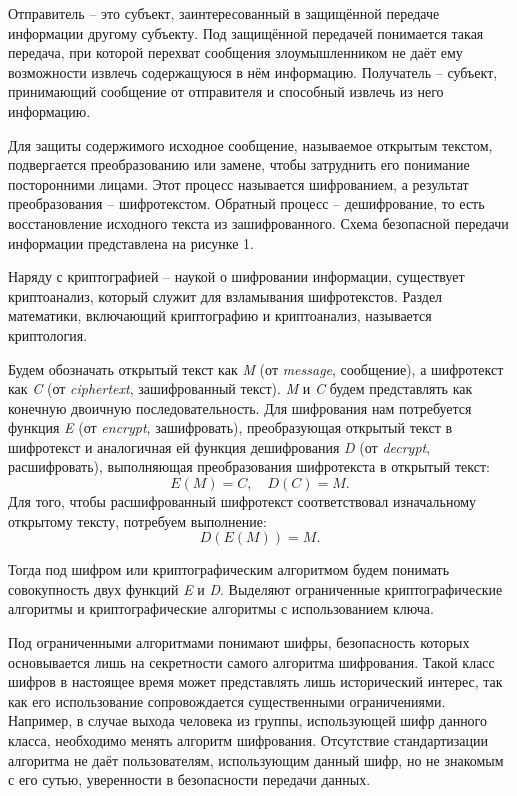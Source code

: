Отправитель – это субъект, заинтересованный в защищённой передаче информации другому субъекту. Под защищённой передачей понимается такая передача, при которой перехват сообщения злоумышленником не даёт ему возможности извлечь содержащуюся в нём информацию. Получатель – субъект, принимающий сообщение от отправителя и способный извлечь из него информацию.

Для защиты содержимого исходное сообщение, называемое открытым текстом, подвергается преобразованию или замене, чтобы затруднить его понимание посторонними лицами. Этот процесс называется шифрованием, а результат преобразования – шифротекстом. Обратный процесс – дешифрование, то есть восстановление исходного текста из зашифрованного.
Схема безопасной передачи информации представлена на рисунке 1.

\mbox{}


Наряду с криптографией – наукой о шифровании информации, существует криптоанализ, который служит для взламывания шифротекстов. Раздел математики, включающий криптографию и криптоанализ, называется криптология.

Будем обозначать открытый текст как \textit{M} (от \textit{message}, сообщение), а шифротекст как \textit{C} (от \textit{ciphertext}, зашифрованный текст). \textit{M} и \textit{C} будем представлять как конечную двоичную последовательность. Для шифрования нам потребуется функция \textit{E} (от \textit{encrypt}, зашифровать), преобразующая открытый текст в шифротекст и аналогичная ей функция дешифрования \textit{D} (от \textit{decrypt}, расшифровать), выполняющая преобразования шифротекста в открытый текст:
\[
E(M) = C,\quad D(C) = M.
\]
Для того, чтобы расшифрованный шифротекст соответствовал изначальному открытому тексту, потребуем выполнение:
\[
D(E(M)) = M.
\]

Тогда под шифром или криптографическим алгоритмом будем понимать совокупность двух функций \textit{E} и \textit{D}. Выделяют ограниченные криптографические алгоритмы и криптографические алгоритмы с использованием ключа.

Под ограниченными алгоритмами понимают шифры, безопасность которых основывается лишь на секретности самого алгоритма шифрования. Такой класс шифров в настоящее время может представлять лишь исторический интерес, так как его использование сопровождается существенными ограничениями. Например, в случае выхода человека из группы, использующей шифр данного класса, необходимо менять алгоритм шифрования. Отсутствие стандартизации алгоритма не даёт пользователям, использующим данный шифр, но не знакомым с его сутью, уверенности в безопасности передачи данных. 


